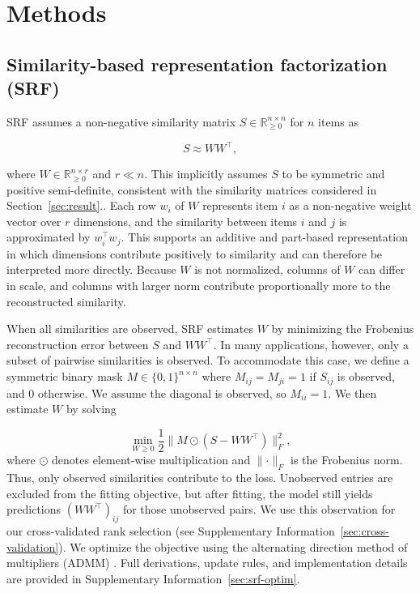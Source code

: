 \documentclass{article}
\begin{document}
\section{Methods}

\subsection{Similarity-based representation factorization (SRF)}

SRF assumes a non-negative similarity matrix $S \in \mathbb{R}_{\geq 0}^{n \times n}$ for $n$ items as

\begin{equation}
S \approx W W^\top,
\end{equation}

where $W \in \mathbb{R}_{\geq 0}^{n \times r}$ and $r \ll n$. This implicitly assumes $S$ to be symmetric and positive semi-definite, consistent with the similarity matrices considered in Section~\ref{sec:result}.. Each row $w_i$ of $W$ represents item $i$ as a non-negative weight vector over $r$ dimensions, and the similarity between items $i$ and $j$ is approximated by $w_i^\top w_j$. This supports an additive and part-based representation in which dimensions contribute positively to similarity and can therefore be interpreted more directly. Because $W$ is not normalized, columns of $W$ can differ in scale, and columns with larger norm contribute proportionally more to the reconstructed similarity.

When all similarities are observed, SRF estimates $W$ by minimizing the Frobenius reconstruction error between $S$ and $WW^\top$. In many applications, however, only a subset of pairwise similarities is observed. To accommodate this case, we define a symmetric binary mask $M \in \{0,1\}^{n \times n}$ where $M_{ij}=M_{ji}=1$ if $S_{ij}$ is observed, and $0$ otherwise. We assume the diagonal is observed, so $M_{ii}=1$. We then estimate $W$ by solving

\begin{equation}
\min_{W \ge 0} \frac{1}{2} \lVert M \odot (S - W W^\top) \rVert_F^2,
\end{equation}
where $\odot$ denotes element-wise multiplication and $\lVert \cdot \rVert_F$ is the Frobenius norm. Thus, only observed similarities contribute to the loss. Unobserved entries are excluded from the fitting objective, but after fitting, the model still yields predictions $(WW^\top)_{ij}$ for those unobserved pairs. We use this observation for our cross-validated rank selection (see Supplementary Information~\ref{sec:cross-validation}). We optimize the objective using the alternating direction method of multipliers (ADMM) \citep{Boyd2011}. Full derivations, update rules, and implementation details are provided in Supplementary Information~\ref{sec:srf-optim}.
\end{document}
